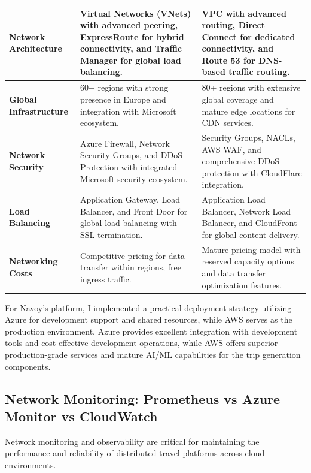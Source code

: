 \begin{longtable}{| p{} | p{} | p{} |}
    \hline
    \endlastfoot

    \textbf{Network Architecture}      & Virtual Networks (VNets) with advanced peering, ExpressRoute for hybrid connectivity, and Traffic Manager for global load balancing. & VPC with advanced routing, Direct Connect for dedicated connectivity, and Route 53 for DNS-based traffic routing. \\
    \hline
    \textbf{Global Infrastructure}     & 60+ regions with strong presence in Europe and integration with Microsoft ecosystem.                                                 & 80+ regions with extensive global coverage and mature edge locations for CDN services.                            \\
    \hline
    \textbf{Network Security}          & Azure Firewall, Network Security Groups, and DDoS Protection with integrated Microsoft security ecosystem.                           & Security Groups, NACLs, AWS WAF, and comprehensive DDoS protection with CloudFlare integration.                   \\
    \hline
    \textbf{Load Balancing}            & Application Gateway, Load Balancer, and Front Door for global load balancing with SSL termination.                                   & Application Load Balancer, Network Load Balancer, and CloudFront for global content delivery.                     \\
    \hline
    \textbf{Networking Costs}          & Competitive pricing for data transfer within regions, free ingress traffic.                                                          & Mature pricing model with reserved capacity options and data transfer optimization features.                      \\
    \hline
\end{longtable}

For Navoy's platform, I implemented a practical deployment strategy utilizing Azure for development support and shared resources, while AWS serves as the production environment. Azure provides excellent integration with development tools and cost-effective development operations, while AWS offers superior production-grade services and mature AI/ML capabilities for the trip generation components.

\subsection{Network Monitoring: Prometheus vs Azure Monitor vs CloudWatch}
Network monitoring and observability are critical for maintaining the performance and reliability of distributed travel platforms across cloud environments.

